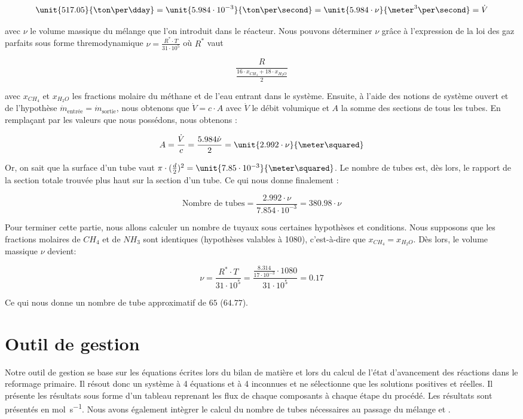 $$\unit{517.05}{\ton\per\dday} = \unit{5.984\cdot 10^{-3}}{\ton\per\second} = \unit{5.984\cdot \nu}{\meter^{3}\per\second} = \dot{V}$$

avec $\nu$ le volume massique du mélange que l'on introduit dans le réacteur. Nous pouvons déterminer $\nu$ grâce à 
l'expression de la loi des gaz parfaits sous forme thremodynamique $\nu = \frac{R^*\cdot T}{31\cdot 10^{5}}$ où $R^{*}$ vaut 

$$\frac{R}{\frac{16\cdot x_{CH_4}+18\cdot x_{H_2O}}{2}}$$

avec $x_{CH_4}$ et $x_{H_2O}$ les fractions molaire du méthane
et de l'eau entrant dans le système. Ensuite, à l'aide des notions de système ouvert et de l'hypothèse $\dot{m}_{\text{entrée}} = \dot{m}_{\text{sortie}}$,
nous obtenons que $\dot{V} = c \cdot  A$ avec $\dot{V}$ le débit volumique et $A$ la somme des sections de tous les tubes. 
En remplaçant par les valeurs que nous possédons, nous obtenons :

$$A = \frac{\dot{V}}{c} = \frac{5.984\dot \nu}{2} = \unit{2.992\cdot \nu}{\meter\squared}$$

Or, on sait que la surface d'un tube vaut $\pi\cdot (\frac{d}{2})^{2} = \unit{7.85\cdot 10^{-3}}{\meter\squared}$. 
Le nombre de tubes est, dès lors, le rapport de la section totale trouvée plus haut sur la section d'un tube. 
Ce qui nous donne finalement : 

$$\text{Nombre de tubes} = \frac{2.992\cdot \nu}{7.854\cdot 10^{-3}} = 380.98\cdot \nu$$

Pour terminer cette partie, nous allons calculer un nombre de tuyaux sous certaines hypothèses et conditions.
Nous supposons que les fractions molaires de $CH_{4}$ et de $NH_{3}$ sont identiques (hypothèses valables à \unit{1080}{\kelvin}),
c'est-à-dire que $x_{CH_4} = x_{H_2O}$. Dès lors, le volume massique $\nu$ devient:

$$\nu = \frac{R^*\cdot T}{31\cdot 10^5} = \frac{\frac{8.314}{17\cdot 10^{-3}}\cdot 1080}{31\cdot 10^5} = 0.17$$

Ce qui nous donne un nombre de tube approximatif de $65$ ($64.77$).

\section{Outil de gestion}
Notre outil de gestion se base sur les équations écrites lors du
bilan de matière et lors du calcul de l'état d'avancement des réactions
dans le reformage primaire. Il résout donc un système à 4 équations
et à 4 inconnues et ne sélectionne que les solutions positives et réelles.
Il présente les résultats sous forme d'un tableau reprenant les flux de chaque
composants à chaque étape du procédé. Les résultats sont présentés en \unit{\mole\per\second}.
Nous avons également intègrer le calcul du nombre de tubes nécessaires au 
passage du mélange  et .

